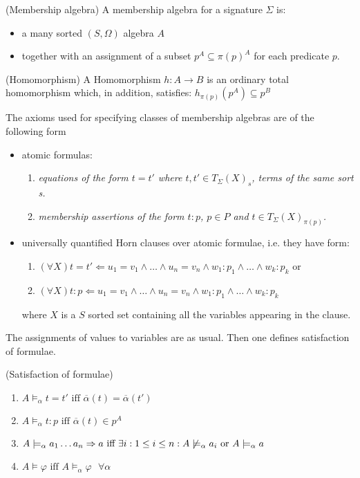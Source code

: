 \documentclass[10pt]{article}
\begin{document}
\begin{definition} (Membership algebra)
A membership algebra for a signature $\Sigma$ is:
\begin{itemize} 
\item a many sorted $(S,\Omega)$ algebra $A$
\item together with an assignment of a subset $ p^A \subseteq {\pi(p)}^A$ for each predicate $p$.
\end{itemize}
\end{definition}

\begin{definition} (Homomorphism)
A Homomorphism $h:A \to B$ is an ordinary total homomorphism which, in
addition, satisfies: $h_{\pi(p)}(p^A) \subseteq p^B$
\end{definition}

\begin{definition}
The axioms used for specifying classes of membership algebras are of the following form
\begin{itemize}
\item atomic formulas:
	\begin{enumerate}
	\item \it{equations} of the form $t=t'$ where $t,t' \in T_\Sigma(X)_s$, terms of the same sort s.
	\item \it{membership assertions} of the form  $t:p$, $p \in P$ and $t \in T_\Sigma(X)_{\pi(p)}$.
	\end{enumerate}
\item universally quantified Horn clauses over atomic formulae, i.e. they have form:
	\begin{enumerate}
	\item $(\forall X) t=t' \Leftarrow u_1=v_1 \wedge \ldots \wedge u_n=v_n \wedge w_1:p_1 \wedge \ldots \wedge w_k:p_k$ or
	\item $(\forall X) t:p \Leftarrow u_1=v_1 \wedge \ldots \wedge u_n=v_n \wedge w_1:p_1 \wedge \ldots \wedge w_k:p_k$
	\end{enumerate}
where $X$ is a $S$ sorted set containing all the variables appearing in the clause.
\end{itemize}
\end{definition}
The assignments of values to variables are as usual. Then one defines
satisfaction of formulae.
\begin{definition}(Satisfaction of formulae)
\begin{enumerate}
\item $A \models_\alpha t = t' \mbox{ iff } \overline{\alpha}(t) =\overline{\alpha}(t')$
\item $A \models_\alpha t:p \mbox{ iff } \overline{\alpha}(t) \in p^A$ %
\item $ A \models_\alpha a_1 \ldots a_n \Rightarrow a \mbox{ iff } \exists i: 1 \leq i \leq n : A \not\models_\alpha a_i \mbox{ or }  A \models_\alpha a$
\item $A \models \varphi \mbox{ iff } A \models_\alpha \varphi \mbox{ } \forall \alpha$
\end{enumerate}
\end{definition}
\end{document}
